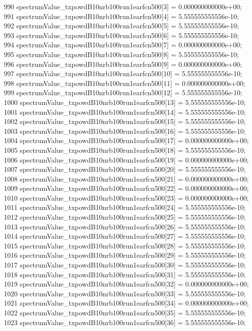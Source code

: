\begin{DoxyCode}
990   spectrumValue\_txpowdB10nrb100run1earfcn500[3] = 0.000000000000e+00;
991   spectrumValue\_txpowdB10nrb100run1earfcn500[4] = 5.555555555556e-10;
992   spectrumValue\_txpowdB10nrb100run1earfcn500[5] = 5.555555555556e-10;
993   spectrumValue\_txpowdB10nrb100run1earfcn500[6] = 5.555555555556e-10;
994   spectrumValue\_txpowdB10nrb100run1earfcn500[7] = 0.000000000000e+00;
995   spectrumValue\_txpowdB10nrb100run1earfcn500[8] = 5.555555555556e-10;
996   spectrumValue\_txpowdB10nrb100run1earfcn500[9] = 0.000000000000e+00;
997   spectrumValue\_txpowdB10nrb100run1earfcn500[10] = 5.555555555556e-10;
998   spectrumValue\_txpowdB10nrb100run1earfcn500[11] = 0.000000000000e+00;
999   spectrumValue\_txpowdB10nrb100run1earfcn500[12] = 5.555555555556e-10;
1000   spectrumValue\_txpowdB10nrb100run1earfcn500[13] = 5.555555555556e-10;
1001   spectrumValue\_txpowdB10nrb100run1earfcn500[14] = 5.555555555556e-10;
1002   spectrumValue\_txpowdB10nrb100run1earfcn500[15] = 5.555555555556e-10;
1003   spectrumValue\_txpowdB10nrb100run1earfcn500[16] = 5.555555555556e-10;
1004   spectrumValue\_txpowdB10nrb100run1earfcn500[17] = 0.000000000000e+00;
1005   spectrumValue\_txpowdB10nrb100run1earfcn500[18] = 5.555555555556e-10;
1006   spectrumValue\_txpowdB10nrb100run1earfcn500[19] = 0.000000000000e+00;
1007   spectrumValue\_txpowdB10nrb100run1earfcn500[20] = 5.555555555556e-10;
1008   spectrumValue\_txpowdB10nrb100run1earfcn500[21] = 0.000000000000e+00;
1009   spectrumValue\_txpowdB10nrb100run1earfcn500[22] = 0.000000000000e+00;
1010   spectrumValue\_txpowdB10nrb100run1earfcn500[23] = 0.000000000000e+00;
1011   spectrumValue\_txpowdB10nrb100run1earfcn500[24] = 5.555555555556e-10;
1012   spectrumValue\_txpowdB10nrb100run1earfcn500[25] = 5.555555555556e-10;
1013   spectrumValue\_txpowdB10nrb100run1earfcn500[26] = 5.555555555556e-10;
1014   spectrumValue\_txpowdB10nrb100run1earfcn500[27] = 5.555555555556e-10;
1015   spectrumValue\_txpowdB10nrb100run1earfcn500[28] = 5.555555555556e-10;
1016   spectrumValue\_txpowdB10nrb100run1earfcn500[29] = 5.555555555556e-10;
1017   spectrumValue\_txpowdB10nrb100run1earfcn500[30] = 5.555555555556e-10;
1018   spectrumValue\_txpowdB10nrb100run1earfcn500[31] = 5.555555555556e-10;
1019   spectrumValue\_txpowdB10nrb100run1earfcn500[32] = 0.000000000000e+00;
1020   spectrumValue\_txpowdB10nrb100run1earfcn500[33] = 5.555555555556e-10;
1021   spectrumValue\_txpowdB10nrb100run1earfcn500[34] = 0.000000000000e+00;
1022   spectrumValue\_txpowdB10nrb100run1earfcn500[35] = 5.555555555556e-10;
1023   spectrumValue\_txpowdB10nrb100run1earfcn500[36] = 5.555555555556e-10;

\end{DoxyCode}

